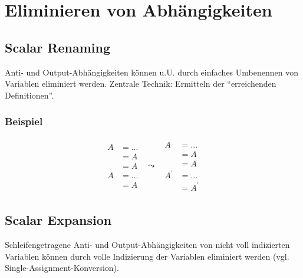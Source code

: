\setcounter{section}{8}
\section{Eliminieren von Abhängigkeiten}

\subsection{Scalar Renaming}

Anti- und Output-Abhängigkeiten können u.U. durch einfaches Umbenennen
von Variablen eliminiert werden. Zentrale Technik: Ermitteln der
``erreichenden Definitionen''.

\subsubsection{Beispiel}



\[
\begin{array}{ccc}
\begin{aligned}
A &= ... \\
   &= A \\
   &= A \\
A &= ... \\
   &= A
\end{aligned}
&
\leadsto
&
\begin{aligned}
A &= ... \\
   &= A \\
   &= A \\
A^\prime &= ... \\
   &= A^\prime
\end{aligned}
\end{array}
\]



\subsection{Scalar Expansion}

Schleifengetragene Anti- und Output-Abhängigkeiten von nicht voll
indizierten Variablen können durch volle Indizierung der Variablen
eliminiert werden (vgl. Single-Assignment-Konversion).


